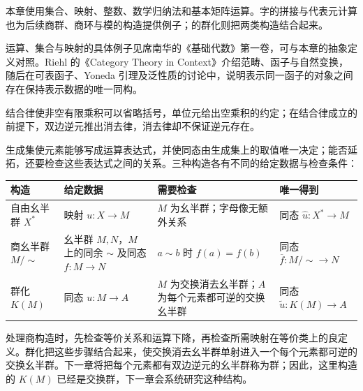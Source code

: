 \ProseParagraphBreak
本章使用集合、映射、整数、数学归纳法和基本矩阵运算。字的拼接与代表元计算也为后续商群、商环与模的构造提供例子；的群化则把两类构造结合起来。

\ProseParagraphBreak
运算、集合与映射的具体例子见席南华的《基础代数》第一卷\cite[第2章, 第5章]{Xi2016BasicAlgebraI}，可与本章的抽象定义对照。Riehl 的《Category Theory in Context》\cite[Chapter 1]{Riehl2016CategoryTheory}介绍范畴、函子与自然变换，随后在可表函子、Yoneda 引理及泛性质的讨论中\cite[Sections 2.1--2.3, especially Proposition 2.3.1]{Riehl2016CategoryTheory}，说明表示同一函子的对象之间存在保持表示数据的唯一同构。






\begin{chaptersummary}
	结合律使非空有限乘积可以省略括号，单位元给出空乘积的约定；在结合律成立的前提下，双边逆元推出消去律，消去律却不保证逆元存在。

	\ProseParagraphBreak
	生成集使元素能够写成运算表达式，并使同态由生成集上的取值唯一决定；能否延拓，还要检查这些表达式之间的关系。三种构造各有不同的给定数据与检查条件：

	\begin{center}
		\small
		\begin{tabularx}{\linewidth}{@{}p{.17\linewidth}p{.22\linewidth}>{\raggedright\arraybackslash}XX@{}}
			\toprule
			构造 & 给定数据 & 需要检查 & 唯一得到 \\
			\midrule
			自由幺半群 \(X^*\) & 映射 \(u:X\to M\) & \(M\) 为幺半群；字母像无额外关系 & 同态 \(\widehat u:X^*\to M\) \\
			商幺半群 \(M/{\sim}\) & 幺半群 \(M,N\)，\(M\) 上的同余 \(\sim\) 及同态 \(f:M\to N\) & \(a\sim b\) 时 \(f(a)=f(b)\) & 同态 \(\overline f:M/{\sim}\to N\) \\
			群化 \(K(M)\) & 同态 \(u:M\to A\) & \(M\) 为交换消去幺半群；\(A\) 为每个元素都可逆的交换幺半群 & 同态 \(\widetilde u:K(M)\to A\) \\
			\bottomrule
		\end{tabularx}
	\end{center}

	处理商构造时，先检查等价关系和运算下降，再检查所需映射在等价类上的良定义。群化把这些步骤结合起来，使交换消去幺半群单射进入一个每个元素都可逆的交换幺半群。下一章将把每个元素都有双边逆元的幺半群称为群；因此，这里构造的 \(K(M)\) 已经是交换群，下一章会系统研究这种结构。
\end{chaptersummary}

